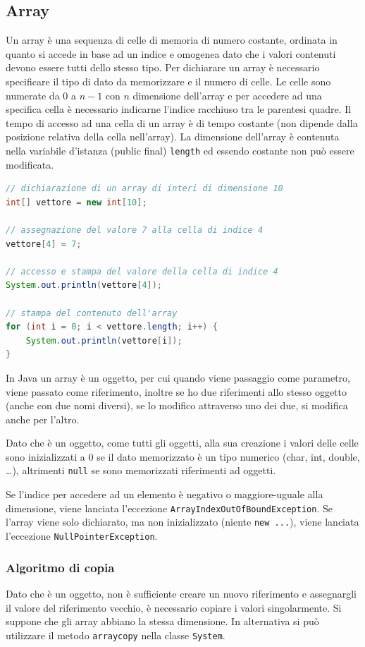 \documentclass[a4paper]{article}
\begin{document}
\subsection{Array}
Un array è una sequenza di celle di memoria di numero costante, ordinata in quanto si accede in base ad un indice e omogenea
dato che i valori contenuti devono essere tutti dello stesso tipo. Per dichiarare un array è necessario specificare il tipo
di dato da memorizzare e il numero di celle. Le celle sono numerate da \(0\) a \(n-1\) con \(n\) dimensione dell'array e per
accedere ad una specifica cella è necessario indicarne l'indice racchiuso tra le parentesi quadre. Il tempo di accesso ad una
cella di un array è di tempo costante (non dipende dalla posizione relativa della cella nell'array). La dimensione dell'array
è contenuta nella variabile d'istanza (public final) \verb|length| ed essendo costante non può essere modificata.

\begin{lstlisting}[language=Java]
// dichiarazione di un array di interi di dimensione 10
int[] vettore = new int[10];

// assegnazione del valore 7 alla cella di indice 4
vettore[4] = 7;

// accesso e stampa del valore della cella di indice 4
System.out.println(vettore[4]);

// stampa del contenuto dell'array
for (int i = 0; i < vettore.length; i++) {
	System.out.println(vettore[i]);
}
\end{lstlisting}

In Java un array è un oggetto, per cui quando viene passaggio come parametro, viene passato come riferimento, inoltre se ho due
riferimenti allo stesso oggetto (anche con due nomi diversi), se lo modifico attraverso uno dei due, si modifica anche per l'altro. 

Dato che è un oggetto, come tutti gli oggetti, alla sua creazione i valori delle celle sono inizializzati a 0 se il dato
memorizzato è un tipo numerico (char, int, double, \dots), altrimenti \verb|null| se sono memorizzati riferimenti ad oggetti.

Se l'indice per accedere ad un elemento è negativo o maggiore-uguale alla dimensione, viene lanciata l'eccezione
\verb|ArrayIndexOutOfBoundException|. Se l'array viene solo dichiarato, ma non inizializzato (niente \verb|new ...|), viene
lanciata l'eccezione \verb|NullPointerException|.

\subsubsection*{Algoritmo di copia}
Dato che è un oggetto, non è sufficiente creare un nuovo riferimento e assegnargli il valore del riferimento vecchio, è necessario
copiare i valori singolarmente. Si suppone che gli array abbiano la stessa dimensione. In alternativa si può utilizzare il metodo
\verb|arraycopy| nella classe \verb|System|.
\end{document}
